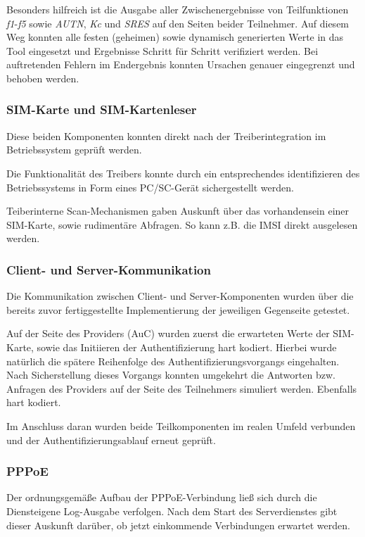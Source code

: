 		Besonders hilfreich ist die Ausgabe aller Zwischenergebnisse von Teilfunktionen
		\textit{f1}-\textit{f5} sowie \textit{AUTN}, \textit{Kc} und \textit{SRES} auf
		den Seiten beider Teilnehmer. Auf diesem Weg konnten alle festen (geheimen) sowie
		dynamisch generierten Werte in das Tool eingesetzt und Ergebnisse Schritt für
		Schritt verifiziert werden. Bei auftretenden Fehlern im Endergebnis konnten Ursachen
		genauer eingegrenzt und behoben werden.

		\subsubsection{SIM-Karte und SIM-Kartenleser}
		Diese beiden Komponenten konnten direkt nach der Treiberintegration im Betriebssystem
		geprüft werden.

		Die Funktionalität des Treibers konnte durch ein entsprechendes identifizieren des
		Betriebssystems in Form eines PC/SC-Gerät sichergestellt werden.

		Teiberinterne Scan-Mechanismen gaben Auskunft über das vorhandensein einer SIM-Karte,
		sowie rudimentäre Abfragen. So kann z.B. die IMSI direkt ausgelesen werden.

		\subsubsection{Client- und Server-Kommunikation}
		Die Kommunikation zwischen Client- und Server-Komponenten wurden über die bereits zuvor
		fertiggestellte Implementierung der jeweiligen Gegenseite getestet.

		Auf der Seite des Providers (AuC) wurden zuerst die erwarteten Werte der SIM-Karte, sowie
		das Initiieren der Authentifizierung hart kodiert. Hierbei wurde natürlich die spätere
		Reihenfolge des Authentifizierungsvorgangs eingehalten. Nach Sicherstellung dieses Vorgangs
		konnten umgekehrt die Antworten bzw. Anfragen des Providers auf der Seite des Teilnehmers
		simuliert werden. Ebenfalls hart kodiert.

		Im Anschluss daran wurden beide Teilkomponenten im realen Umfeld verbunden und der
		Authentifizierungsablauf erneut geprüft.

		\subsubsection{PPPoE}
		Der ordnungsgemäße Aufbau der PPPoE-Verbindung ließ sich durch die Diensteigene
		Log-Ausgabe verfolgen. Nach dem Start des Serverdienstes gibt dieser Auskunft
		darüber, ob jetzt einkommende Verbindungen erwartet werden.

